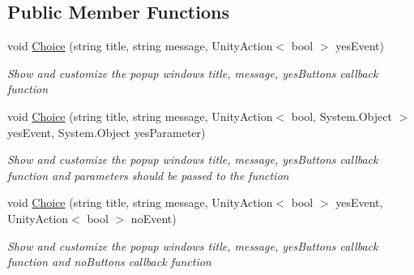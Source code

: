 \subsection*{Public Member Functions}
\begin{DoxyCompactItemize}
\item 
void \hyperlink{classdoki_unity_1_1_modal_panel_ab6e6c7b12989582f10d1947a52e20051}{Choice} (string title, string message, Unity\+Action$<$ bool $>$ yes\+Event)
\begin{DoxyCompactList}\small\item\em Show and customize the popup window\textquotesingle{}s title, message, yes\+Button\textquotesingle{}s callback function \end{DoxyCompactList}\item 
void \hyperlink{classdoki_unity_1_1_modal_panel_a919e94df42bca242808a093c3d06e5b4}{Choice} (string title, string message, Unity\+Action$<$ bool, System.\+Object $>$ yes\+Event, System.\+Object yes\+Parameter)
\begin{DoxyCompactList}\small\item\em Show and customize the popup window\textquotesingle{}s title, message, yes\+Button\textquotesingle{}s callback function and parameters should be passed to the function \end{DoxyCompactList}\item 
void \hyperlink{classdoki_unity_1_1_modal_panel_aa967d929957bd4a42663cbdb1ed4127f}{Choice} (string title, string message, Unity\+Action$<$ bool $>$ yes\+Event, Unity\+Action$<$ bool $>$ no\+Event)
\begin{DoxyCompactList}\small\item\em Show and customize the popup window\textquotesingle{}s title, message, yes\+Button\textquotesingle{}s callback function and no\+Button\textquotesingle{}s callback function \end{DoxyCompactList}\end{DoxyCompactItemize}
